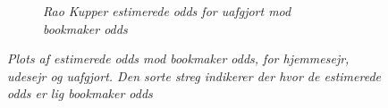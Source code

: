 \documentclass[11pt,a4paper]{article}
\begin{document}
\begin{figure}[h!]
\begin{subfigure}[b]{0.4\linewidth}
    \caption{\textit{Rao Kupper estimerede odds for uafgjort mod bookmaker odds}}
    \label{fig:StatUafgjortOdds}  
    \end{subfigure}
\caption{\textit{Plots af estimerede odds mod bookmaker odds, for hjemmesejr, udesejr og uafgjort. Den sorte streg indikerer der hvor de estimerede odds er lig bookmaker odds}}
  \label{fig:OddsPlot}
\end{figure}
\clear
\printbibliography %
\end{document}
